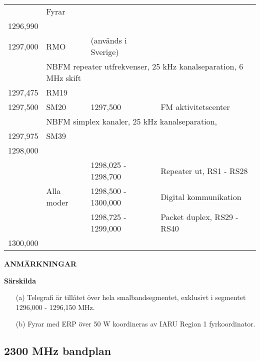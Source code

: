\begin{longtable}{llll}
         & Fyrar & & \\
1296,990 & & & \\
1297,000 & RMO & (används i Sverige) & \\
         & \multicolumn{3}{l}{NBFM repeater utfrekvenser, 25 kHz kanalseparation, 6 MHz skift} \\
1297,475 & RM19 & & \\
1297,500 & SM20 & 1297,500 & FM aktivitetscenter \\
         & \multicolumn{3}{l}{NBFM simplex kanaler, 25 kHz kanalseparation,} \\
1297,975 & SM39 & & \\
1298,000 & & & \\
         &            & 1298,025 - 1298,700 & Repeater ut, RS1 - RS28 \\
         & Alla moder & 1298,500 - 1300,000 & Digital kommunikation \\
         &            & 1298,725 - 1299,000 & Packet duplex, RS29 - RS40 \\
1300,000 & & & \\
\end{longtable}

\textbf{ANMÄRKNINGAR}

\textbf{Särskilda}

\begin{itemize}
\item[(a)] Telegrafi är tillåtet över hela smalbandsegmentet, exklusivt
i segmentet 1296,000 - 1296,150 MHz.
\item[(b)] Fyrar med ERP över 50 W koordineras av IARU Region 1 fyrkoordinator.
\end{itemize}

\subsection{2300 MHz bandplan}

